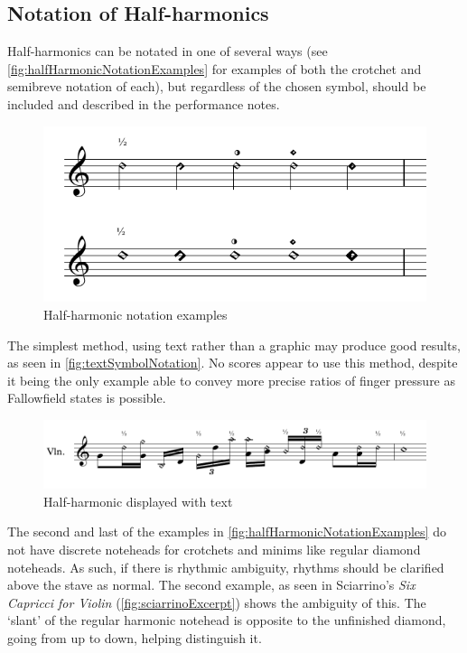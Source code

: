 \subsection{Notation of Half-harmonics}\label{sec:notation-half-harmonics}
Half-harmonics can be notated in one of several ways (see \autoref{fig:halfHarmonicNotationExamples} for examples of both the crotchet and semibreve notation of each), but regardless of the chosen symbol, should be included and described in the performance notes.


\begin{figure}
    \includegraphics[width=\linewidth]{./resources/halfHarmonicNotationExamples.pdf}
    \caption{Half-harmonic notation examples}\label{fig:halfHarmonicNotationExamples}
  \end{figure}

  
The simplest method, using text rather than a graphic may produce good results, as seen in \autoref{fig:textSymbolNotation}.
No scores appear to use this method, despite it being the only example able to convey more precise ratios of finger pressure as Fallowfield states is possible.\autocite[http://www.cellomap.com/index/the-string/multiphonics-and-other-multiple-sounds/other-multiple-sounds.html]{fallowfieldCelloMap}

\begin{figure}
  \includegraphics[page=1,width=\textwidth]{resources/halfharmonicsSingleExamples.pdf}
  \caption{Half-harmonic displayed with text}\label{fig:textSymbolNotation}
\end{figure}

The second and last of the examples in \autoref{fig:halfHarmonicNotationExamples} do not have discrete noteheads for crotchets and minims like regular diamond noteheads.
As such, if there is rhythmic ambiguity, rhythms should be clarified above the stave as normal.
The second example, as seen in Sciarrino's \emph{Six Capricci for Violin} (\autoref{fig:sciarrinoExcerpt}) shows the ambiguity of this.
The `slant' of the regular harmonic notehead is opposite to the unfinished diamond, going from up to down, helping distinguish it.

